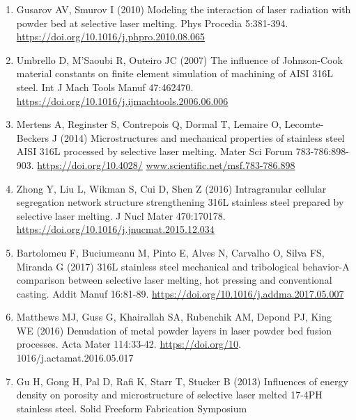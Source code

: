 \documentclass[10pt]{article}
\begin{document}
\begin{enumerate}
  \item Gusarov AV, Smurov I (2010) Modeling the interaction of laser radiation with powder bed at selective laser melting. Phys Procedia 5:381-394. \href{https://doi.org/10.1016/j.phpro.2010.08.065}{https://doi.org/10.1016/j.phpro.2010.08.065}

  \item Umbrello D, M'Saoubi R, Outeiro JC (2007) The influence of Johnson-Cook material constants on finite element simulation of machining of AISI 316L steel. Int J Mach Tools Manuf 47:462470. \href{https://doi.org/10.1016/j.ijmachtools.2006.06.006}{https://doi.org/10.1016/j.ijmachtools.2006.06.006}

  \item Mertens A, Reginster S, Contrepois Q, Dormal T, Lemaire O, Lecomte-Beckers J (2014) Microstructures and mechanical properties of stainless steel AISI 316L processed by selective laser melting. Mater Sci Forum 783-786:898-903. \href{https://doi.org/10.4028/}{https://doi.org/10.4028/} \href{http://www.scientific.net/msf.783-786.898}{www.scientific.net/msf.783-786.898}

  \item Zhong Y, Liu L, Wikman S, Cui D, Shen Z (2016) Intragranular cellular segregation network structure strengthening 316L stainless steel prepared by selective laser melting. J Nucl Mater 470:170178. \href{https://doi.org/10.1016/j.jnucmat.2015.12.034}{https://doi.org/10.1016/j.jnucmat.2015.12.034}

  \item Bartolomeu F, Buciumeanu M, Pinto E, Alves N, Carvalho O, Silva FS, Miranda G (2017) 316L stainless steel mechanical and tribological behavior-A comparison between selective laser melting, hot pressing and conventional casting. Addit Manuf 16:81-89. \href{https://doi.org/10.1016/j.addma.2017.05.007}{https://doi.org/10.1016/j.addma.2017.05.007}

  \item Matthews MJ, Guss G, Khairallah SA, Rubenchik AM, Depond PJ, King WE (2016) Denudation of metal powder layers in laser powder bed fusion processes. Acta Mater 114:33-42. \href{https://doi.org/10}{https://doi.org/10}. 1016/j.actamat.2016.05.017

  \item Gu H, Gong H, Pal D, Rafi K, Starr T, Stucker B (2013) Influences of energy density on porosity and microstructure of selective laser melted 17-4PH stainless steel. Solid Freeform Fabrication Symposium


\end{enumerate}
\end{document}
